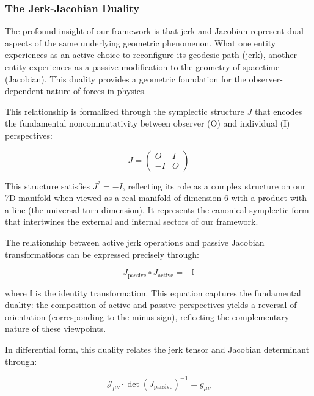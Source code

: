 \documentclass{article}
\begin{document}
\subsubsection{The Jerk-Jacobian Duality}

The profound insight of our framework is that jerk and Jacobian represent dual aspects of the same underlying geometric phenomenon. What one entity experiences as an active choice to reconfigure its geodesic path (jerk), another entity experiences as a passive modification to the geometry of spacetime (Jacobian). This duality provides a geometric foundation for the observer-dependent nature of forces in physics.

This relationship is formalized through the symplectic structure $J$ that encodes the fundamental noncommutativity between observer (O) and individual (I) perspectives:

\begin{equation}
J = \begin{pmatrix} O & I \\ -I & O \end{pmatrix}
\end{equation}

This structure satisfies $J^2 = -I$, reflecting its role as a complex structure on our 7D manifold when viewed as a real manifold of dimension 6 with a product with a line (the universal turn dimension). It represents the canonical symplectic form that intertwines the external and internal sectors of our framework.

The relationship between active jerk operations and passive Jacobian transformations can be expressed precisely through:

\begin{equation}
J_{\text{passive}} \circ J_{\text{active}} = -\mathbb{I}
\end{equation}

where $\mathbb{I}$ is the identity transformation. This equation captures the fundamental duality: the composition of active and passive perspectives yields a reversal of orientation (corresponding to the minus sign), reflecting the complementary nature of these viewpoints.

In differential form, this duality relates the jerk tensor and Jacobian determinant through:

\begin{equation}
\mathcal{J}_{\mu\nu} \cdot \det(J_{\text{passive}})^{-1} = g_{\mu\nu}
\end{equation}
\end{document}
